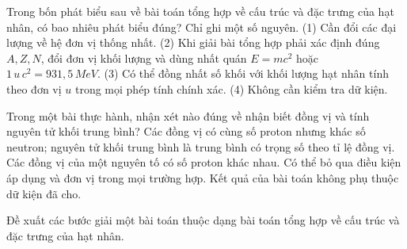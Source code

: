 \begin{ex}
Trong bốn phát biểu sau về bài toán tổng hợp về cấu trúc và đặc trưng của hạt nhân, có bao nhiêu phát biểu đúng? Chỉ ghi một số nguyên. (1) Cần đổi các đại lượng về hệ đơn vị thống nhất. (2) Khi giải bài tổng hợp phải xác định đúng $A,Z,N$, đổi đơn vị khối lượng và dùng nhất quán $E=mc^2$ hoặc $1\,u\,c^2=931,5\,MeV$. (3) Có thể đồng nhất số khối với khối lượng hạt nhân tính theo đơn vị $u$ trong mọi phép tính chính xác. (4) Không cần kiểm tra dữ kiện.
\end{ex}

\begin{ex}
Trong một bài thực hành, nhận xét nào đúng về nhận biết đồng vị và tính nguyên tử khối trung bình?
\choice
{\True Các đồng vị có cùng số proton nhưng khác số neutron; nguyên tử khối trung bình là trung bình có trọng số theo tỉ lệ đồng vị.}
{Các đồng vị của một nguyên tố có số proton khác nhau.}
{Có thể bỏ qua điều kiện áp dụng và đơn vị trong mọi trường hợp.}
{Kết quả của bài toán không phụ thuộc dữ kiện đã cho.}
\end{ex}

\begin{bt}
Đề xuất các bước giải một bài toán thuộc dạng bài toán tổng hợp về cấu trúc và đặc trưng của hạt nhân.
\end{bt}

